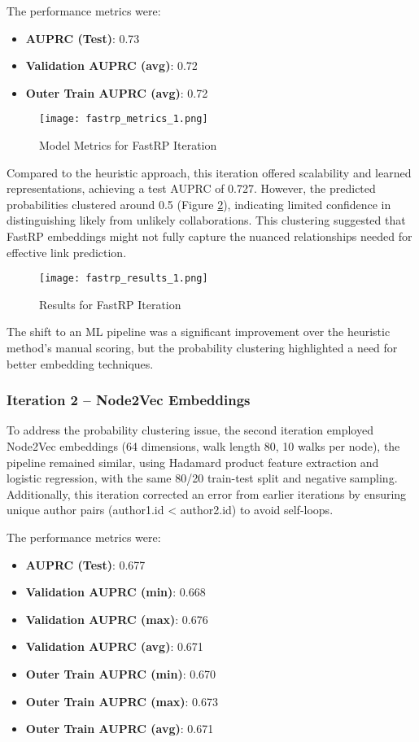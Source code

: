 \documentclass[conference, 12pt]{IEEEtran}
\begin{document}
The performance metrics were:
\begin{itemize}
    \item \textbf{AUPRC (Test)}: 0.73
    \item \textbf{Validation AUPRC (avg)}: 0.72
    \item \textbf{Outer Train AUPRC (avg)}: 0.72
\end{itemize}

\begin{figure}[h]
    \centering
    \texttt{[image: fastrp\_metrics\_1.png]}
    \caption{Model Metrics for FastRP Iteration}
    \label{fig:link_prediction_fastRP_metrics}
\end{figure}

Compared to the heuristic approach, this iteration offered scalability and learned representations, achieving a test AUPRC of 0.727. However, the predicted probabilities clustered around 0.5 (Figure \ref{fig:link_prediction_fastRP_probabilities}), indicating limited confidence in distinguishing likely from unlikely collaborations. This clustering suggested that FastRP embeddings might not fully capture the nuanced relationships needed for effective link prediction.

\begin{figure}[h]
    \centering
    \texttt{[image: fastrp\_results\_1.png]}
    \caption{Results for FastRP Iteration}
    \label{fig:link_prediction_fastRP_probabilities}
\end{figure}

The shift to an ML pipeline was a significant improvement over the heuristic method’s manual scoring, but the probability clustering highlighted a need for better embedding techniques.

\subsubsection{Iteration 2 -- Node2Vec Embeddings}
To address the probability clustering issue, the second iteration employed Node2Vec embeddings (64 dimensions, walk length 80, 10 walks per node), the pipeline remained similar, using Hadamard product feature extraction and logistic regression, with the same 80/20 train-test split and negative sampling. Additionally, this iteration corrected an error from earlier iterations by ensuring unique author pairs (author1.id < author2.id) to avoid self-loops.

The performance metrics were:
\begin{itemize}
    \item \textbf{AUPRC (Test)}: 0.677
    \item \textbf{Validation AUPRC (min)}: 0.668
    \item \textbf{Validation AUPRC (max)}: 0.676
    \item \textbf{Validation AUPRC (avg)}: 0.671
    \item \textbf{Outer Train AUPRC (min)}: 0.670
    \item \textbf{Outer Train AUPRC (max)}: 0.673
    \item \textbf{Outer Train AUPRC (avg)}: 0.671
\end{itemize}
\end{document}
